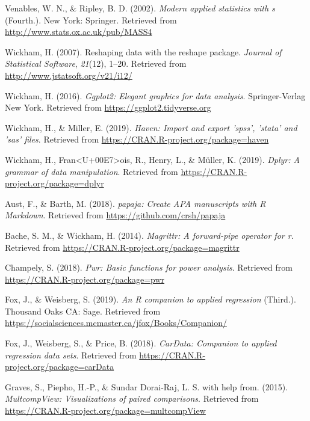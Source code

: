 \documentclass[man]{apa6}
\begin{document}
\hypertarget{ref-R-MASS}{}
Venables, W. N., \& Ripley, B. D. (2002). \emph{Modern applied
statistics with s} (Fourth.). New York: Springer. Retrieved from
\url{http://www.stats.ox.ac.uk/pub/MASS4}

\hypertarget{ref-R-reshape2}{}
Wickham, H. (2007). Reshaping data with the reshape package.
\emph{Journal of Statistical Software}, \emph{21}(12), 1--20. Retrieved
from \url{http://www.jstatsoft.org/v21/i12/}

\hypertarget{ref-R-ggplot2}{}
Wickham, H. (2016). \emph{Ggplot2: Elegant graphics for data analysis}.
Springer-Verlag New York. Retrieved from
\url{https://ggplot2.tidyverse.org}

\hypertarget{ref-R-haven}{}
Wickham, H., \& Miller, E. (2019). \emph{Haven: Import and export
'spss', 'stata' and 'sas' files}. Retrieved from
\url{https://CRAN.R-project.org/package=haven}

\hypertarget{ref-R-dplyr}{}
Wickham, H., Fran\textless{}U+00E7\textgreater{}ois, R., Henry, L., \&
Müller, K. (2019). \emph{Dplyr: A grammar of data manipulation}.
Retrieved from \url{https://CRAN.R-project.org/package=dplyr}

\hypertarget{ref-R-papaja}{}
Aust, F., \& Barth, M. (2018). \emph{papaja: Create APA manuscripts with
R Markdown}. Retrieved from \url{https://github.com/crsh/papaja}

\hypertarget{ref-R-magrittr}{}
Bache, S. M., \& Wickham, H. (2014). \emph{Magrittr: A forward-pipe
operator for r}. Retrieved from
\url{https://CRAN.R-project.org/package=magrittr}

\hypertarget{ref-R-pwr}{}
Champely, S. (2018). \emph{Pwr: Basic functions for power analysis}.
Retrieved from \url{https://CRAN.R-project.org/package=pwr}

\hypertarget{ref-R-car}{}
Fox, J., \& Weisberg, S. (2019). \emph{An R companion to applied
regression} (Third.). Thousand Oaks CA: Sage. Retrieved from
\url{https://socialsciences.mcmaster.ca/jfox/Books/Companion/}

\hypertarget{ref-R-carData}{}
Fox, J., Weisberg, S., \& Price, B. (2018). \emph{CarData: Companion to
applied regression data sets}. Retrieved from
\url{https://CRAN.R-project.org/package=carData}

\hypertarget{ref-R-multcompView}{}
Graves, S., Piepho, H.-P., \& Sundar Dorai-Raj, L. S. with help from.
(2015). \emph{MultcompView: Visualizations of paired comparisons}.
Retrieved from \url{https://CRAN.R-project.org/package=multcompView}
\end{document}
